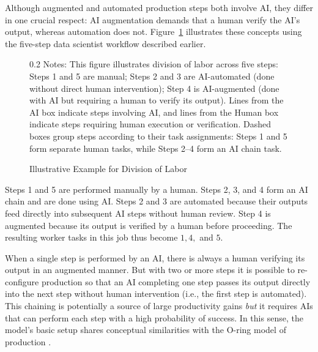 Although augmented and automated production steps both involve AI, they differ in one crucial respect: AI augmentation demands that a human verify the AI's output, whereas automation does not.
Figure~\ref{fig:task_division} illustrates these concepts using the five-step data scientist workflow described earlier.
\begin{figure}[!t]
  \centering
  \caption{Illustrative Example for Division of Labor}
  \label{fig:task_division}
  
  \par\vspace{\fignotesskip}
\begin{minipage}{1\linewidth}
\begin{spacing}{0.2}
{\fontsize{9.5pt}{10pt}\selectfont Notes: This figure illustrates division of labor across five steps: Steps 1 and 5 are manual; Steps 2 and 3 are AI-automated (done without direct human intervention); Step 4 is AI-augmented (done with AI but requiring a human to verify its output).
Lines from the AI box indicate steps involving AI, and lines from the Human box indicate steps requiring human execution or verification.
Dashed boxes group steps according to their task assignments: Steps 1 and 5 form separate human tasks, while Steps 2–4 form an AI chain task.}
\end{spacing}
\end{minipage}
\end{figure}
Steps 1 and 5 are performed manually by a human.  
Steps 2, 3, and 4 form an AI chain and are done using AI.
Steps 2 and 3 are automated because their outputs feed directly into subsequent AI steps without human review.
Step 4 is augmented because its output is verified by a human before proceeding. 
The resulting worker tasks in this job thus become $1,4,$ and $5$.

When a single step is performed by an AI, there is always a human verifying its output in an augmented manner.  
But with two or more steps it is possible to re-configure production so that an AI completing one step passes its output directly into the next step without human intervention (i.e., the first step is automated). 
This chaining is potentially a source of large productivity gains \emph{but} it requires AIs that can perform each step with a high probability of success.
In this sense, the model's basic setup shares conceptual similarities with the O-ring model of production \citep{kremer1993oring, gans2026oring}.

